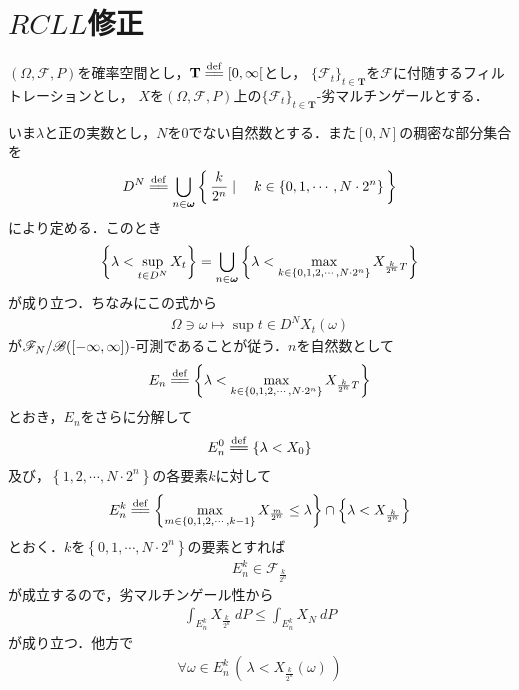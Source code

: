 \section{$RCLL$修正}
	$(\Omega,\mathscr{F},P)$を確率空間とし，$\mathbf{T} \defeq [0,\infty[$とし，
	$\{\mathscr{F}_t\}_{t \in \mathbf{T}}$を$\mathscr{F}$に付随するフィルトレーションとし，
	$X$を$(\Omega,\mathscr{F},P)$上の$\{\mathscr{F}_t\}_{t \in \mathbf{T}}$-劣マルチンゲールとする．
	
	いま$\lambda$と正の実数とし，$N$を$0$でない自然数とする．また$[0,N]$の稠密な部分集合を
	\begin{align}
		D^N \defeq \bigcup_{n \in \Natural} \Set{\frac{k}{2^n}}{k \in \{0,1,\cdots,N \cdot 2^n\}}
	\end{align}
	により定める．このとき
	\begin{align}
		\left\{\lambda < \operatorname*{sup}_{t \in D^N} X_t\right\}
		= \bigcup_{n \in {\boldsymbol \omega}} \left\{\lambda < \max_{k \in \left\{0,1,2,\cdots,N \cdot 2^n\right\}} X_{\frac{k}{2^n}T}\right\}
	\end{align}
	が成り立つ．ちなみにこの式から
	\begin{align}
		\Omega \ni \omega \longmapsto \sup{t \in D^N}X_t(\omega)
	\end{align}
	が$\mathscr{F}_N/\mathscr{B}([-\infty,\infty])$-可測であることが従う．$n$を自然数として
	\begin{align}
		E_n \defeq  \left\{\lambda < \max_{k \in \left\{0,1,2,\cdots,N \cdot 2^n\right\}} X_{\frac{k}{2^n}T}\right\}
	\end{align}
	とおき，$E_n$をさらに分解して
	\begin{align}
		E_n^0 \defeq \left\{\lambda < X_0\right\}
	\end{align}
	及び，$\left\{1,2,\cdots,N \cdot 2^n\right\}$の各要素$k$に対して
	\begin{align}
		E_n^k \defeq \left\{ \max_{m \in \left\{0,1,2,\cdots,k-1\right\}} X_{\frac{m}{2^n}} \leq \lambda \right\} \cap \left\{\lambda < X_{\frac{k}{2^n}}\right\}
	\end{align}
	とおく．$k$を$\left\{0,1,\cdots,N \cdot 2^n\right\}$の要素とすれば
	\begin{align}
		E_n^k \in \mathscr{F}_{\frac{k}{2^n}}
	\end{align}
	が成立するので，劣マルチンゲール性から
	\begin{align}
		\int_{E_n^k} X_{\frac{k}{2^n}}\ dP \leq \int_{E_n^k} X_N\ dP
	\end{align}
	が成り立つ．他方で
	\begin{align}
		\forall \omega \in E_n^k\, \left(\, \lambda < X_{\frac{k}{2^n}}(\omega)\, \right)
	\end{align}
